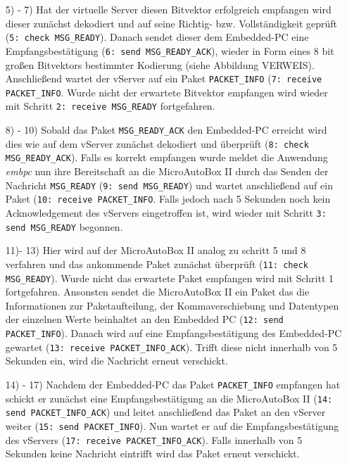 \documentclass[fontsize = 12pt, paper = a4]{scrreprt}
\begin{document}
\begin{itemize}
\item[5) - 7)]
Hat der virtuelle Server diesen Bitvektor erfolgreich empfangen wird dieser zunächst dekodiert und auf seine Richtig- bzw. Vollständigkeit geprüft (\texttt{5: check MSG\_READY}). Danach sendet dieser dem Embedded-PC eine Empfangsbestätigung (\texttt{6: send MSG\_READY\_ACK}), wieder in Form eines 8 bit großen Bitvektors bestimmter Kodierung (siehe Abbildung VERWEIS). Anschließend wartet der vServer auf ein Paket \texttt{PACKET\_INFO} (\texttt{7: receive PACKET\_INFO}. Wurde nicht der erwartete Bitvektor empfangen wird wieder mit Schritt \texttt{2: receive MSG\_READY} fortgefahren.

\item[8) - 10)]
Sobald das Paket \texttt{MSG\_READY\_ACK} den Embedded-PC erreicht wird dies wie auf dem vServer zunächst dekodiert und überprüft (\texttt{8: check MSG\_READY\_ACK}). Falls es korrekt empfangen wurde meldet die Anwendung \emph{embpc} nun ihre Bereitschaft an die MicroAutoBox II durch das Senden der Nachricht \texttt{MSG\_READY} (\texttt{9: send MSG\_READY}) und wartet anschließend auf ein Paket (\texttt{10: receive PACKET\_INFO}. Falls jedoch nach 5 Sekunden noch kein Acknowledgement des vServers eingetroffen ist, wird wieder mit Schritt \texttt{3: send MSG\_READY} begonnen.

\item[11)- 13)]
Hier wird auf der MicroAutoBox II analog zu schritt 5 und 8 verfahren und das ankommende Paket zunächst überprüft (\texttt{11: check MSG\_READY}). Wurde nicht das erwartete Paket empfangen wird mit Schritt 1 fortgefahren. Ansonsten sendet die MicroAutoBox II ein Paket das die Informationen zur Paketaufteilung, der Kommaverschiebung  und Datentypen der einzelnen Werte beinhaltet an den Embedded PC (\texttt{12: send PACKET\_INFO}). Danach wird auf eine Empfangsbestätigung des Embedded-PC gewartet (\texttt{13: receive PACKET\_INFO\_ACK}). Trifft diese nicht innerhalb von 5 Sekunden ein, wird die Nachricht erneut verschickt. 

\item[14) - 17)]
Nachdem der Embedded-PC das Paket \texttt{PACKET\_INFO} empfangen hat schickt er zunächst eine Empfangsbestätigung an die MicroAutoBox II (\texttt{14: send PACKET\_INFO\_ACK}) und leitet anschließend das Paket an den vServer weiter (\texttt{15: send PACKET\_INFO}). Nun wartet er auf die Empfangsbestätigung des vServers (\texttt{17: receive PACKET\_INFO\_ACK}). Falls innerhalb von 5 Sekunden keine Nachricht eintrifft wird das Paket erneut verschickt.


\end{itemize}
\end{document}
